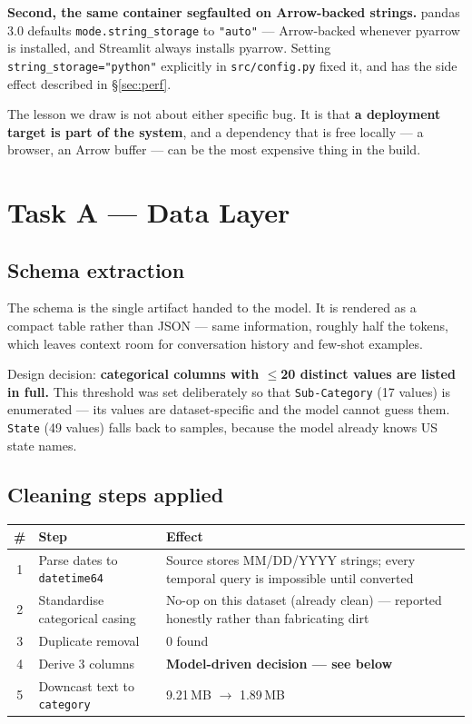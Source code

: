 \documentclass[11pt,a4paper]{article}
\begin{document}
\textbf{Second, the same container segfaulted on Arrow-backed strings.} pandas 3.0
defaults \texttt{mode.string\_storage} to \texttt{"auto"} --- Arrow-backed whenever
pyarrow is installed, and Streamlit always installs pyarrow. Setting
\texttt{string\_storage="python"} explicitly in \texttt{src/config.py} fixed it, and
has the side effect described in \S\ref{sec:perf}.

The lesson we draw is not about either specific bug. It is that \textbf{a deployment
target is part of the system}, and a dependency that is free locally --- a browser, an
Arrow buffer --- can be the most expensive thing in the build.

\section{Task A --- Data Layer}

\subsection{Schema extraction}

The schema is the single artifact handed to the model. It is rendered as a compact
table rather than JSON --- same information, roughly half the tokens, which leaves
context room for conversation history and few-shot examples.

Design decision: \textbf{categorical columns with $\le$20 distinct values are listed in
full.} This threshold was set deliberately so that \texttt{Sub-Category} (17 values) is
enumerated --- its values are dataset-specific and the model cannot guess them.
\texttt{State} (49 values) falls back to samples, because the model already knows US
state names.

\subsection{Cleaning steps applied}

\begin{center}
\begin{tabularx}{\textwidth}{@{}clX@{}}
\toprule
\textbf{\#} & \textbf{Step} & \textbf{Effect} \\
\midrule
1 & Parse dates to \texttt{datetime64} & Source stores MM/DD/YYYY strings; every temporal query is impossible until converted \\
2 & Standardise categorical casing & No-op on this dataset (already clean) --- reported honestly rather than fabricating dirt \\
3 & Duplicate removal & 0 found \\
4 & Derive 3 columns & \textbf{Model-driven decision --- see below} \\
5 & Downcast text to \texttt{category} & 9.21\,MB $\rightarrow$ 1.89\,MB \\
\bottomrule
\end{tabularx}
\end{center}
\end{document}

